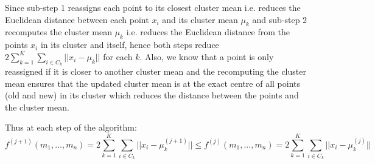 \documentclass[twoside]{Homework}
\begin{document}
\noindent
Since sub-step 1 reassigns each point to its closest cluster mean i.e. reduces the Euclidean distance between each point $x_i$ and its cluster mean $\mu_k$ and sub-step 2 recomputes the cluster mean $\mu_k$ i.e. reduces the Euclidean distance from the points $x_i$ in its cluster and itself, hence both steps reduce $2 \sum_{k=1}^K \sum_{i \in C_k} ||x_i - \mu_k||$ for each $k$. Also, we know that a point is only reassigned if it is closer to another cluster mean and the recomputing the cluster mean ensures that the updated cluster mean is at the exact centre of all points (old and new) in its cluster which reduces the distance between the points and the cluster mean.

Thus at each step of the algorithm: 
\begin{equation*}
f^{(j+1)} (m_1, ..., m_n) = 2 \sum_{k=1}^K \sum_{i \in C_k} ||x_i - \mu_k^{(j+1)}|| \le f^{(j)} (m_1, ..., m_n) = 2 \sum_{k=1}^K \sum_{i \in C_k} ||x_i - \mu_k^{(j)}||
\end{equation*}
\end{document}
